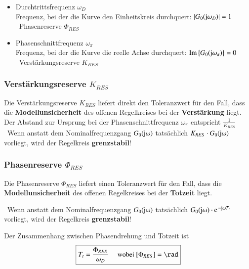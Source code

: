 \begin{itemize}
    \item Durchtrittsfrequenz $\omega_{D}$ \\
        Frequenz, bei der die Kurve den Einheitskreis durchquert: $| G_{0}(\mathrm{j} \omega_{D})| = 1 $ \\
        \textrightarrow\ Phasenreserve $\Phi_{RES}$
    
    \item Phasenschnittfrequenz $\omega_{\pi}$ \\
        Frequenz, bei der die Kurve die reelle Achse durchquert: $\operatorname{Im}\left\{G_{0}(\mathrm{j} \omega_{\pi})\right\} = 0$\\
        \textrightarrow\ Verstärkungsreserve $K_{RES}$
\end{itemize}


\subsubsection{Verstärkungsreserve $K_{RES}$}

Die Verstärkungsreserve $K_{RES}$ liefert direkt den Toleranzwert für den Fall, dass die \textbf{Modellunsicherheit} des 
offenen Regelkreises bei der \textbf{Verstärkung} liegt. \\
Der Abstand zur Ursprung bei der Phasenschnittfrequenz $\omega_{\pi}$ entspricht $\frac{1}{K_{RES}}$ \\
\textrightarrow\ Wenn anstatt dem Nominalfrequenzgang $G_0(\mathrm{j} \omega)$ tatsächlich $K_{RES} \cdot G_0(\mathrm{j} \omega)$ vorliegt, wird der
Regelkreis \textbf{grenzstabil}!


\subsubsection{Phasenreserve $\Phi_{RES}$}

Die Phasenreserve $\Phi_{RES}$ liefert einen Toleranzwert für den Fall, dass die \\
\textbf{Modellunsicherheit} des offenen Regelkreises bei der \textbf{Totzeit} liegt.

\textrightarrow\ Wenn anstatt dem Nominalfrequenzgang $G_0(\mathrm{j} \omega)$ tatsächlich $G_0(\jimg \omega) \cdot \e^{- \jimg \omega T_t}$ vorliegt, 
wird der Regelkreis \textbf{grenzstabil}!
\bigskip

Der Zusammenhang zwischen Phasendrehung und Totzeit ist
$$ \boxed{ T_t = \frac{\Phi_{RES}}{\omega_D}  \quad \text{ wobei } [\Phi_{RES}] = \rad } $$



